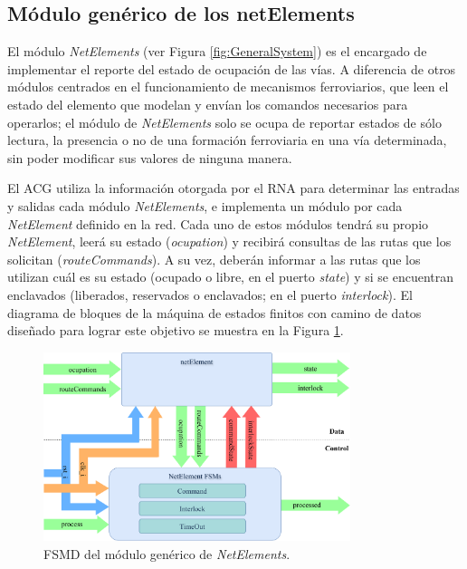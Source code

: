 \subsection{Módulo genérico de los netElements}
	\label{sec:ACG_net}
	
	El módulo \textit{NetElements} (ver Figura \ref{fig:GeneralSystem}) es el encargado de implementar el reporte del estado de ocupación de las vías. A diferencia de otros módulos centrados en el funcionamiento de mecanismos ferroviarios, que leen el estado del elemento que modelan y envían los comandos necesarios para operarlos; el módulo de \textit{NetElements} solo se ocupa de reportar estados de sólo lectura, la presencia o no de una formación ferroviaria en una vía determinada, sin poder modificar sus valores de ninguna manera.
	
	El ACG utiliza la información otorgada por el RNA para determinar las entradas y salidas cada módulo \textit{NetElements}, e implementa un módulo por cada \textit{NetElement} definido en la red. Cada uno de estos módulos tendrá su propio \textit{NetElement}, leerá su estado (\textit{ocupation}) y recibirá consultas de las rutas que los solicitan (\textit{routeCommands}). A su vez, deberán informar a las rutas que los utilizan cuál es su estado (ocupado o libre, en el puerto \textit{state}) y si se encuentran enclavados (liberados, reservados o enclavados; en el puerto \textit{interlock}). El diagrama de bloques de la máquina de estados finitos con camino de datos diseñado para lograr este objetivo se muestra en la Figura \ref{fig:NET_module}.
	
	\begin{figure}[H]
		\centering
		\includegraphics[width=0.8\textwidth]{Figuras/NET_module}
		\centering\caption{FSMD del módulo genérico de \textit{NetElements}.}
		\label{fig:NET_module}
	\end{figure}
	
